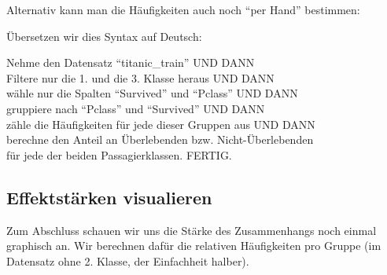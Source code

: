 \documentclass[12pt,ngerman,]{book}
\makeatletter
\newenvironment{Shaded}{\begin{snugshade}}{\end{snugshade}}
\newcommand{\KeywordTok}[1]{\textcolor[rgb]{0.13,0.29,0.53}{\textbf{{#1}}}}
\newcommand{\DataTypeTok}[1]{\textcolor[rgb]{0.13,0.29,0.53}{{#1}}}
\newcommand{\DecValTok}[1]{\textcolor[rgb]{0.00,0.00,0.81}{{#1}}}
\newcommand{\StringTok}[1]{\textcolor[rgb]{0.31,0.60,0.02}{{#1}}}
\newcommand{\CommentTok}[1]{\textcolor[rgb]{0.56,0.35,0.01}{\textit{{#1}}}}
\newcommand{\NormalTok}[1]{{#1}}
\newenvironment{kframe}{%
\medskip{}
\setlength{\fboxsep}{.8em}
 \def\at@end@of@kframe{}%
 \ifinner\ifhmode%
  \def\at@end@of@kframe{\end{minipage}}%
  \begin{minipage}{\columnwidth}%
 \fi\fi%
 \def\FrameCommand##1{\hskip\@totalleftmargin \hskip-\fboxsep
 \colorbox{shadecolor}{##1}\hskip-\fboxsep
     \hskip-\linewidth \hskip-\@totalleftmargin \hskip\columnwidth}%
 \MakeFramed {\advance\hsize-\width
   \@totalleftmargin\z@ \linewidth\hsize
   \@setminipage}}%
 {\par\unskip\endMakeFramed%
 \at@end@of@kframe}
\renewenvironment{Shaded}{\begin{kframe}}{\end{kframe}}
\let\BeginKnitrBlock\begin \let\EndKnitrBlock\end
\makeatother
\begin{document}
Alternativ kann man die Häufigkeiten auch noch ``per Hand'' bestimmen:

\begin{Shaded}
\end{Shaded}

Übersetzen wir dies Syntax auf Deutsch:

\BeginKnitrBlock{rmdpseudocode}
Nehme den Datensatz ``titanic\_train'' UND DANN\\
Filtere nur die 1. und die 3. Klasse heraus UND DANN\\
wähle nur die Spalten ``Survived'' und ``Pclass'' UND DANN\\
gruppiere nach ``Pclass'' und ``Survived'' UND DANN\\
zähle die Häufigkeiten für jede dieser Gruppen aus UND DANN\\
berechne den Anteil an Überlebenden bzw. Nicht-Überlebenden\\
für jede der beiden Passagierklassen. FERTIG.
\EndKnitrBlock{rmdpseudocode}

\subsection{Effektstärken visualieren}\label{effektstarken-visualieren}

Zum Abschluss schauen wir uns die Stärke des Zusammenhangs noch einmal
graphisch an. Wir berechnen dafür die relativen Häufigkeiten pro Gruppe
(im Datensatz ohne 2. Klasse, der Einfachheit halber).
\end{document}
